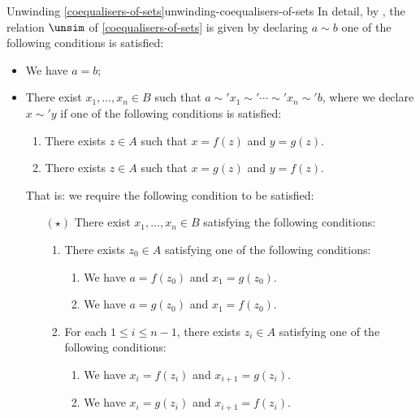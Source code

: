 \begin{remark}{Unwinding \cref{coequalisers-of-sets}}{unwinding-coequalisers-of-sets}%
    In detail, by , the relation $\unsim$ of \cref{coequalisers-of-sets} is given by declaring $a\sim b$ \textiff one of the following conditions is satisfied:%
    \begin{itemize}
        \item We have $a=b$;
        \item There exist $x_{1},\ldots,x_{n}\in B$ such that $a\sim'x_{1}\sim'\cdots\sim'x_{n}\sim'b$, where we declare $x\sim'y$ if one of the following conditions is satisfied:
            \begin{enumerate}
                \item There exists $z\in A$ such that $x=f(z)$ and $y=g(z)$.
                \item There exists $z\in A$ such that $x=g(z)$ and $y=f(z)$.
            \end{enumerate}
            That is: we require the following condition to be satisfied:
            \begin{itemize}
                \item[$(\star)$]There exist $x_{1},\ldots,x_{n}\in B$ satisfying the following conditions:
                    \begin{enumerate}
                        \item There exists $z_{0}\in A$ satisfying one of the following conditions:
                            \begin{enumerate}
                                \item We have $a=f(z_{0})$ and $x_{1}=g(z_{0})$.
                                \item We have $a=g(z_{0})$ and $x_{1}=f(z_{0})$.
                            \end{enumerate}
                        \item For each $1\leq i\leq n-1$, there exists $z_{i}\in A$ satisfying one of the following conditions:
                            \begin{enumerate}
                                \item We have $x_{i}=f(z_{i})$ and $x_{i+1}=g(z_{i})$.
                                \item We have $x_{i}=g(z_{i})$ and $x_{i+1}=f(z_{i})$.

\end{enumerate}
\end{enumerate}
\end{itemize}
\end{itemize}
\end{remark}
